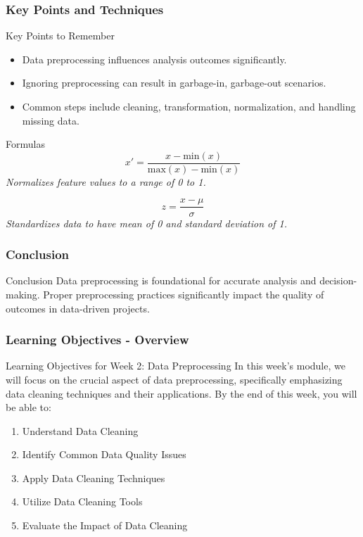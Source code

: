 \documentclass[aspectratio=169]{beamer}
\begin{document}
\begin{frame}[fragile]
    \frametitle{Key Points and Techniques}
    \begin{block}{Key Points to Remember}
        \begin{itemize}
            \item Data preprocessing influences analysis outcomes significantly.
            \item Ignoring preprocessing can result in garbage-in, garbage-out scenarios.
            \item Common steps include cleaning, transformation, normalization, and handling missing data.
        \end{itemize}
    \end{block}

    \begin{block}{Formulas}
        \begin{equation}
            x' = \frac{x - \text{min}(x)}{\text{max}(x) - \text{min}(x)}
        \end{equation}
        \textit{Normalizes feature values to a range of 0 to 1.}

        \begin{equation}
            z = \frac{x - \mu}{\sigma}
        \end{equation}
        \textit{Standardizes data to have mean of 0 and standard deviation of 1.}
    \end{block}
\end{frame}

\begin{frame}[fragile]
    \frametitle{Conclusion}
    \begin{block}{Conclusion}
        Data preprocessing is foundational for accurate analysis and decision-making. Proper preprocessing practices significantly impact the quality of outcomes in data-driven projects.
    \end{block}
\end{frame}

\begin{frame}[fragile]
    \frametitle{Learning Objectives - Overview}
    \begin{block}{Learning Objectives for Week 2: Data Preprocessing}
        In this week’s module, we will focus on the crucial aspect of data preprocessing, specifically emphasizing data cleaning techniques and their applications. By the end of this week, you will be able to:
    \end{block}
    \begin{enumerate}
        \item Understand Data Cleaning
        \item Identify Common Data Quality Issues
        \item Apply Data Cleaning Techniques
        \item Utilize Data Cleaning Tools
        \item Evaluate the Impact of Data Cleaning
    \end{enumerate}
\end{frame}
\end{document}
